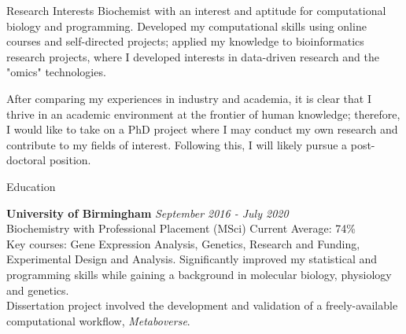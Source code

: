 \documentclass{resume}
\begin{document}
\begin{rSection}{Research Interests}
Biochemist with an interest and aptitude for computational biology and programming. Developed my computational skills using online courses and self-directed projects; applied my knowledge to bioinformatics research projects, where I developed interests in data-driven research and the "omics" technologies. 

After comparing my experiences in industry and academia, it is clear that I thrive in an academic environment at the frontier of human knowledge; therefore, I would like to take on a PhD project where I may conduct my own research and contribute to my fields of interest. Following this, I will likely pursue a post-doctoral position. 
\end{rSection}
\begin{rSection}{Education}

{\bf University of Birmingham} \hfill {\em September 2016 - July 2020} 
\\ Biochemistry with Professional Placement (MSci) \hfill {Current Average: 74\%} \smallskip \\
Key courses: Gene Expression Analysis, Genetics, Research and Funding, Experimental Design and Analysis. Significantly improved my statistical and programming skills while gaining a background in molecular biology, physiology and genetics. \smallskip \\ Dissertation project involved the development and validation of a freely-available computational workflow, \textit{Metaboverse}.  \\

\end{rSection}
\end{document}
